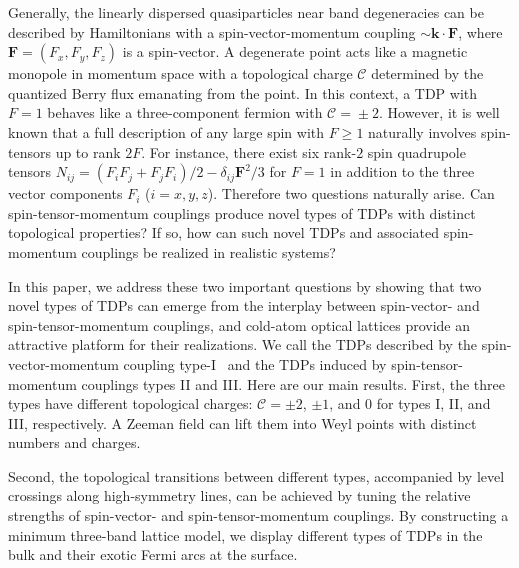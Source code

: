 \documentclass[aps,prl,floatfix,twocolumn,reprint]{revtex4}
\begin{document}
Generally, the linearly dispersed quasiparticles near band degeneracies can
be described by Hamiltonians with a spin-vector-momentum coupling $\sim%
\bm{k}\cdot\bm{F}$, where $\bm{F}=(F_x,F_y,F_z)$ is a spin-vector. A
degenerate point acts like a magnetic monopole in momentum space with a
topological charge $\mathcal{C}$ determined by the quantized Berry flux
emanating from the point. In this context, a TDP with $F\!=\!1$ behaves like
a three-component fermion with $\mathcal{C}\!=\!\pm 2$. However, it is well
known that a full description of any large spin with $F\!\geq\!1$ naturally
involves spin-tensors up to rank $2F$. For instance, there exist six rank-$2$
spin quadrupole tensors $N_{ij}=(F_{i}F_{j}+F_{j}F_{i})/2-\delta _{ij}\bm{F}%
^{2}/3$ for $F\!=\!1$ in addition to the three vector components $F_i$ ($%
i\!=\!x,y,z$). Therefore two questions naturally arise. Can
spin-tensor-momentum couplings produce novel types of TDPs with distinct
topological properties? If so, how can such novel TDPs and associated
spin-momentum couplings be realized in realistic systems?

In this paper, we address these two important questions by showing that two
novel types of TDPs can emerge from the interplay between spin-vector- and
spin-tensor-momentum couplings, and cold-atom optical lattices provide an
attractive platform for their realizations. We call the TDPs described by
the spin-vector-momentum coupling type-I~\cite%
{tf1,tf2,tf3,tf4,tf5,tf6,tf7,tf8,tf9,tf10,tf11,tf12,tf13} and the TDPs
induced by spin-tensor-momentum couplings types II and III. Here are our main
results. First, the three types have different topological charges: $%
\mathcal{C}=\pm 2$, $\pm 1$, and $0$ for types I, II, and III, respectively.
A Zeeman field can lift them into Weyl points with distinct numbers and
charges. 

Second, the topological transitions between different types, accompanied by
level crossings along high-symmetry lines, can be achieved by tuning the
relative strengths of spin-vector- and spin-tensor-momentum couplings. By
constructing a minimum three-band lattice model, we display different types
of TDPs in the bulk and their exotic Fermi arcs at the surface.
\end{document}
